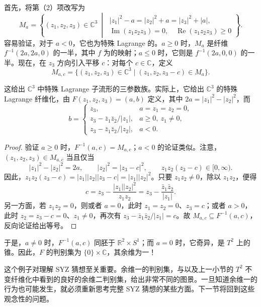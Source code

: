 \begin{example}\label{ex:7.11}
首先，将第（2）项改写为
\[
M_a=\left\{(z_1,z_2,z_3)\in\mathbb C^3\ \middle|\
\begin{gathered}
|z_1|^2-a=|z_2|^2+a=|z_3|^2+|a|,\\
\operatorname{Im}(z_1z_2z_3)=0,\quad\operatorname{Re}(z_1z_2z_3)\geq0
\end{gathered}\right\}.
\]
容易验证，对于 $a<0$，它也为特殊 Lagrange 的。$a\geq0$ 时，$M_a$ 是纤维 $f^{-1}(2a,2a,0)$ 的一半，其中 $f$ 为的映射；$a\leq0$ 时，它则是 $f^{-1}(2a,0,0)$ 的一半。现在，在 $z_3$ 方向引入平移 $c$：对每个 $c\in\mathbb C$，定义
\[
M_{a,c}=\{(z_1,z_2,z_3)\in\mathbb C^3\mid(z_1,z_2,z_3-c)\in M_a\}.
\]

这给出 $\mathbb C^3$ 中特殊 Lagrange 子流形的三参数族。实际上，它给出 $\mathbb C^3$ 的特殊 Lagrange 纤维化，由 $F(z_1,z_2,z_3)=(a,b)$ 定义，其中 $2a=|z_1|^2-|z_2|^2$，而
\[
b=\begin{cases}
z_3,&a=z_1=z_2=0,\\
z_3-\bar z_1\bar z_2/|z_1|,&a\geq0,\ z_1\neq0,\\
z_3-\bar z_1\bar z_2/|z_2|,&a<0.
\end{cases}
\]

\begin{proof}
验证 $a\geq0$ 时，$F^{-1}(a,c)=M_{a,c}$；$a<0$ 的论证类似。注意，$(z_1,z_2,z_3)\in M_{a,c}$ 当且仅当
\[
|z_1|^2-|z_2|^2=2a,\qquad |z_2|^2=|z_3-c|^2,
\qquad z_1z_2(z_3-c)\in[0,\infty).
\]
因此，$z_1z_2(z_3-c)=|z_1||z_2||z_3-c|=|z_1||z_2|^2$。只要 $z_1z_2\neq0$，除以 $z_1z_2$，便得
\[
c=z_3-\frac{|z_1||z_2|^2}{z_1z_2}
=z_3-\frac{\bar z_1\bar z_2}{|z_1|}.
\]
另一方面，若 $z_1z_2=0$，则或者 $a=0$，此时 $z_1=z_2=0$、$z_3=c$；或者 $a>0$，此时 $z_2=z_3-c=0$、$z_1\neq0$，再次有 $z_3-\bar z_1\bar z_2/|z_1|=c$。故 $M_{a,c}\subseteq F^{-1}(a,c)$，反向论证给出等号。
\end{proof}

于是，$a\neq0$ 时，$F^{-1}(a,c)$ 同胚于 $\mathbb R^2\times S^1$；而 $a=0$ 时，它奇异，是 $T^2$ 上的锥。因此，$F$ 的判别集为 $\{0\}\times\mathbb C$，其余维为一！
\end{example}

这个例子对理解 SYZ 猜想至关重要。余维一的判别集，与以及上一小节的 $T^2$ 不变纤维化中看到的良好的余维二判别集，给出非常不同的图景。一旦知道余维一的行为也可能发生，就必须重新思考完整 SYZ 猜想的某些方面。下一节将回到这些观念性的问题。

